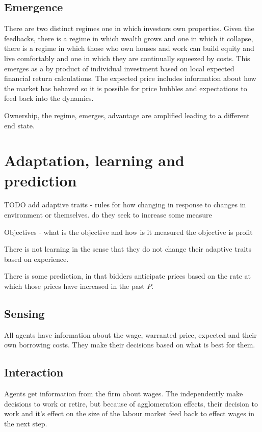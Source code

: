 \subsection{Emergence}
There are two distinct regimes one in which investors own properties. Given the feedbacks, there is a regime in which wealth grows and one in which it collapse, there is a regime in which those who own houses and work can build equity and live comfortably and one in which they are continually squeezed by costs. This emerges as a by product of individual investment based on local expected financial return calculations. 
The expected price includes information about how the market has behaved so it is possible for price bubbles and expectations to feed back into the dynamics. 

Ownership, the regime, emerges, advantage are amplified leading to a different end state.

\section{Adaptation, learning and prediction}

TODO add adaptive traits - rules for how changing in response to changes in environment or themselves. do they seek to increase some measure

Objectives - what is the objective and how is it measured
the objective is profit

There is not learning in the sense that they do not change their adaptive traits based on experience. 


There is some prediction, in that bidders anticipate prices based on the rate at which those prices have increased in the past $\dot P$.


\subsection{Sensing}
All agents have information about the wage, warranted price, expected and their own borrowing costs. They make their decisions based on what is best for them. 

\subsection{Interaction}
Agents get information from the firm about wages. The independently make decisions to work or retire, but because of agglomeration effects, their decision to work and it's effect on the size of the labour market feed back to effect wages in the next step. 

